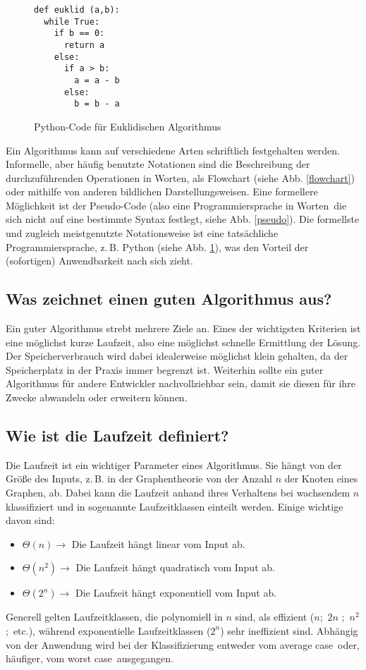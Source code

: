 \begin{figure}
\begin{lstlisting}
def euklid (a,b):
  while True:
    if b == 0:
      return a
    else:
      if a > b:
        a = a - b
      else:
        b = b - a
\end{lstlisting}
\caption{Python-Code für Euklidischen Algorithmus}
\label{python}
\end{figure}

Ein Algorithmus kann auf verschiedene Arten schriftlich festgehalten werden. Informelle, aber häufig benutzte Notationen sind die Beschreibung der durchzuführenden Operationen in Worten, als Flowchart (siehe Abb. \ref{flowchart}) oder mithilfe von anderen bildlichen Darstellungsweisen. 
Eine formellere Möglichkeit ist der Pseudo-Code (also eine \glqq Programmiersprache in Worten\grqq \, die sich nicht auf eine bestimmte Syntax festlegt, siehe Abb. \ref{pseudo}). Die formellste und zugleich meistgenutzte Notationsweise ist eine tatsächliche Programmiersprache, z.\,B. Python (siehe Abb. \ref{python}), was den Vorteil der (sofortigen) Anwendbarkeit nach sich zieht.


	\subsection{Was zeichnet einen guten Algorithmus aus?}
	Ein guter Algorithmus strebt mehrere Ziele an. Eines der wichtigsten Kriterien ist eine möglichst kurze Laufzeit, also eine möglichst schnelle Ermittlung der Lösung. Der Speicherverbrauch wird dabei idealerweise möglichst klein gehalten, da der Speicherplatz in der Praxis immer begrenzt ist. Weiterhin sollte ein guter Algorithmus für andere Entwickler nachvollziehbar sein, damit sie diesen für ihre Zwecke abwandeln oder erweitern können.
	\subsection{Wie ist die Laufzeit definiert?}
	Die Laufzeit ist ein wichtiger Parameter eines Algorithmus. Sie hängt von der Größe des Inputs, z.\,B. in der Graphentheorie von der Anzahl $n$ der Knoten eines Graphen, ab. Dabei kann die Laufzeit anhand ihres Verhaltens bei wachsendem $n$ klassifiziert und in sogenannte Laufzeitklassen einteilt werden. Einige wichtige davon sind:
	\begin{itemize}
	\item $\Theta(n) \rightarrow$ Die Laufzeit hängt linear vom Input ab.
	\item $\Theta(n^2)\rightarrow$ Die Laufzeit hängt quadratisch vom Input ab.
	\item $\Theta (2^n) \rightarrow$ Die Laufzeit hängt exponentiell vom Input ab.
	\end{itemize}
	Generell gelten Laufzeitklassen, die polynomiell in $n$ sind, als effizient ($n$;\ $2n$ ;\ $n^2$ ;\ etc.), während exponentielle Laufzeitklassen ($2^n$) sehr ineffizient sind. Abhängig von der Anwendung wird bei der Klassifizierung entweder vom \glqq average case\grqq \ oder, häufiger, vom \glqq worst case\grqq \ ausgegangen.